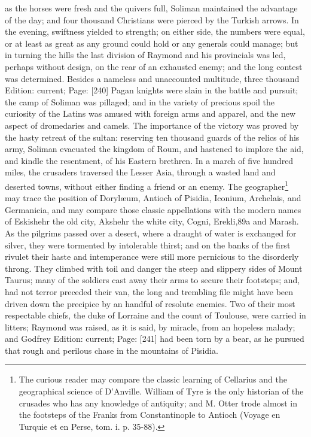 as the horses were fresh and the quivers full, Soliman maintained the advantage of the day; and four thousand Christians were pierced by the Turkish arrows. In the evening, swiftness yielded to strength; on either side, the numbers were equal, or at least as great as any ground could hold or any generals could manage; but in turning the hills the last division of Raymond and his provincials was led, perhaps without design, on the rear of an exhausted enemy; and the long contest was determined. Besides a nameless and unaccounted multitude, three thousand Edition: current; Page: [240] Pagan knights were slain in the battle and pursuit; the camp of Soliman was pillaged; and in the variety of precious spoil the curiosity of the Latins was amused with foreign arms and apparel, and the new aspect of dromedaries and camels. The importance of the victory was proved by the hasty retreat of the sultan: reserving ten thousand guards of the relics of his army, Soliman evacuated the kingdom of Roum, and hastened to implore the aid, and kindle the resentment, of his Eastern brethren. In a march of five hundred miles, the crusaders traversed the Lesser Asia, through a wasted land and deserted towns, without either finding a friend or an enemy. The geographer\footnote{The curious reader may compare the classic learning of Cellarius and the geographical science of D\texthebrew{}’Anville. William of Tyre is the only historian of the crusades who has any knowledge of antiquity; and M. Otter trode almost in the footsteps of the Franks from Constantinople to Antioch (Voyage en Turquie et en Perse, tom. i. p. 35-88).} may trace the position of Dorylæum, Antioch of Pisidia, Iconium, Archelais, and Germanicia, and may compare those classic appellations with the modern names of Eskishehr the old city, Akshehr the white city, Cogni, Erekli,89a and Marash. As the pilgrims passed over a desert, where a draught of water is exchanged for silver, they were tormented by intolerable thirst; and on the banks of the first rivulet their haste and intemperance were still more pernicious to the disorderly throng. They climbed with toil and danger the steep and slippery sides of Mount Taurus; many of the soldiers cast away their arms to secure their footsteps; and, had not terror preceded their van, the long and trembling file might have been driven down the precipice by an handful of resolute enemies. Two of their most respectable chiefs, the duke of Lorraine and the count of Toulouse, were carried in litters; Raymond was raised, as it is said, by miracle, from an hopeless malady; and Godfrey Edition: current; Page: [241] had been torn by a bear, as he pursued that rough and perilous chase in the mountains of Pisidia.

